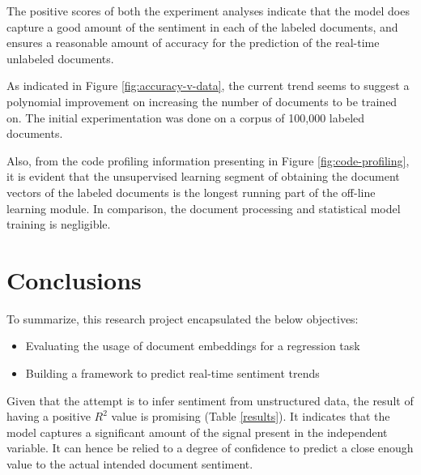 \documentclass[conference]{IEEEtran}
\begin{document}
        \begin{table}[h] \caption{Evaluation results} \label{results}
            \centering
        \end{table}

        The positive scores of both the experiment analyses indicate that the model does capture a good amount of the sentiment in each of the labeled documents, and ensures a reasonable amount of accuracy for the prediction of the real-time unlabeled documents.

        As indicated in Figure \ref{fig:accuracy-v-data}, the current trend seems to suggest a polynomial improvement on increasing the number of documents to be trained on. 
        The initial experimentation was done on a corpus of 100,000 labeled documents. 

        Also, from the code profiling information presenting in Figure \ref{fig:code-profiling}, it is evident that the unsupervised learning segment of obtaining the document vectors of the labeled documents is the longest running part of the off-line learning module. 
        In comparison, the document processing and statistical model training is negligible.

\vspace{5mm}

\section{Conclusions}
    To summarize, this research project encapsulated the below objectives:
    \begin{itemize}
        \item Evaluating the usage of document embeddings for a regression task
        \item Building a framework to predict real-time sentiment trends
    \end{itemize}

    Given that the attempt is to infer sentiment from unstructured data, the result of having a positive $R^2$ value is promising (Table \ref{results}).
    It indicates that the model captures a significant amount of the signal present in the independent variable.
    It can hence be relied to a degree of confidence to predict a close enough value to the actual intended document sentiment.
\end{document}
